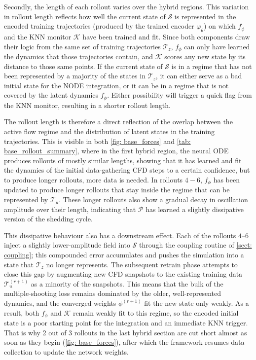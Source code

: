 Secondly, the length of each rollout varies over the hybrid regions. This variation in rollout length reflects how well the current state of $\mathcal{S}$ is represented in the encoded training trajectories (produced by the trained encoder $\varphi_\theta$) on which $f_\phi$ and the KNN monitor $\mathcal{K}$ have been trained and fit. Since both components draw their logic from the same set of training trajectories $\boldsymbol{\mathcal{T}}_z$, $f_\phi$ can only have learned the dynamics that those trajectories contain, and $\mathcal{K}$ scores any new state by its distance to those same points. If the current state of $\mathcal{S}$ is in a regime that has not been represented by a majority of the states in $\boldsymbol{\mathcal{T}}_z$, it can either serve as a bad initial state for the NODE integration, or it can be in a regime that is not covered by the latent dynamics $f_\phi$. Either possibility will trigger a quick flag from the KNN monitor, resulting in a shorter rollout length.  

The rollout length is therefore a direct reflection of the overlap between the active flow regime and the distribution of latent states in the training trajectories. This is visible in both \autoref{fig: base_forces} and \autoref{tab: base_rollout_summary}, where in the first hybrid region, the neural ODE produces rollouts of mostly similar lengths, showing that it has learned and fit the dynamics of the initial data-gathering CFD steps to a certain confidence, but to produce longer rollouts, more data is needed. In rollouts $4-6$, $f_\phi$ has been updated to produce longer rollouts that stay inside the regime that can be represented by $\boldsymbol{\mathcal{T}}_u$. These longer rollouts also show a gradual decay in oscillation amplitude over their length, indicating that $\mathcal{P}$ has learned a slightly dissipative version of the shedding cycle.

This dissipative behaviour also has a downstream effect. Each of the rollouts $4$--$6$ inject a slightly lower-amplitude field into $\mathcal{S}$ through the coupling routine of \autoref{sect: coupling}; this compounded error accumulates and pushes the simulation into a state that $\boldsymbol{\mathcal{T}}_z$ no longer represents. The subsequent retrain phase attempts to close this gap by augmenting new CFD snapshots to the existing training data $\boldsymbol{\mathcal{T}}_u^{(r+1)}$ as a minority of the snapshots. This means that the bulk of the multiple-shooting loss remains dominated by the older, well-represented dynamics, and the converged weights $\phi^{(r+1)}$ fit the new state only weakly. As a result, both $f_\phi$ and $\mathcal{K}$ remain weakly fit to this regime, so the encoded initial state is a poor starting point for the integration and an immediate KNN trigger. That is why 2 out of 3 rollouts in the last hybrid section are cut short almost as soon as they begin (\autoref{fig: base_forces}), after which the framework resumes data collection to update the network weights. 

